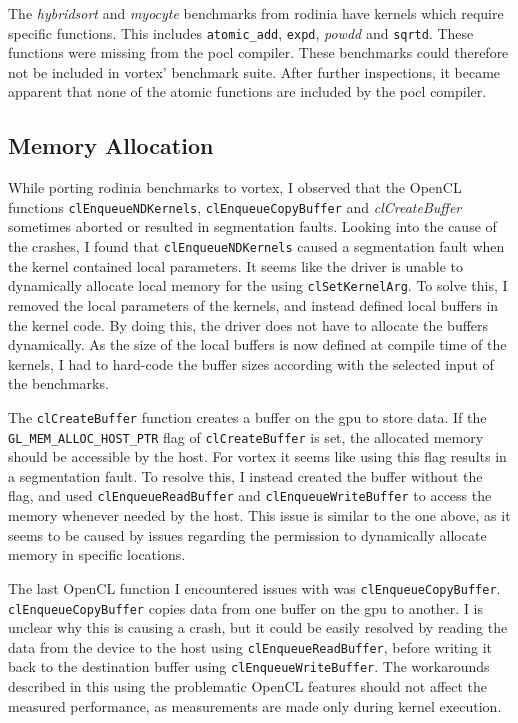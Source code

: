 The \textit{hybridsort} and \textit{myocyte} benchmarks from \Gls{rodinia} have kernels which require specific functions. This includes \texttt{atomic\_add}, \texttt{expd}, \textit{powdd} and \texttt{sqrtd}. These functions were missing from the \Gls{pocl} compiler. These benchmarks could therefore not be included in \Gls{vortex}' benchmark suite. After further inspections, it became apparent that none of the atomic functions are included by the \Gls{pocl} compiler. 

\subsection{Memory Allocation}

While porting \Gls{rodinia} benchmarks to \Gls{vortex}, I observed that the OpenCL functions \texttt{clEnqueueNDKernels}, \texttt{clEnqueueCopyBuffer} and \textit{clCreateBuffer} sometimes aborted or resulted in segmentation faults. Looking into the cause of the crashes, I found that \texttt{clEnqueueNDKernels} caused a segmentation fault when the kernel contained local parameters. It seems like the driver is unable to dynamically allocate local memory for the  using \texttt{clSetKernelArg}. To solve this, I removed the local parameters of the kernels, and instead defined local buffers in the kernel code. By doing this, the driver does not have to allocate the buffers dynamically. As the size of the local buffers is now defined at compile time of the kernels, I had to hard-code the buffer sizes according with the selected input of the benchmarks.

The \texttt{clCreateBuffer} function creates a buffer on the \acrshort{gpu} to store data. If the \texttt{GL\_MEM\_ALLOC\_HOST\_PTR} flag of \texttt{clCreateBuffer} is set, the allocated memory should be accessible by the host. For \Gls{vortex} it seems like using this flag results in a segmentation fault. To resolve this, I instead created the buffer without the flag, and used \texttt{clEnqueueReadBuffer} and \texttt{clEnqueueWriteBuffer} to access the memory whenever needed by the host. This issue is similar to the one above, as it seems to be caused by issues regarding the permission to dynamically allocate memory in specific locations.

The last OpenCL function I encountered issues with was \texttt{clEnqueueCopyBuffer}. \texttt{clEnqueueCopyBuffer} copies data from one buffer on the \acrshort{gpu} to another. I is unclear why this is causing a crash, but it could be easily resolved by reading the data from the device to the host using \texttt{clEnqueueReadBuffer}, before writing it back to the destination buffer using \texttt{clEnqueueWriteBuffer}. The workarounds described in this  using the problematic OpenCL features should not affect the measured performance, as measurements are made only during kernel execution.

